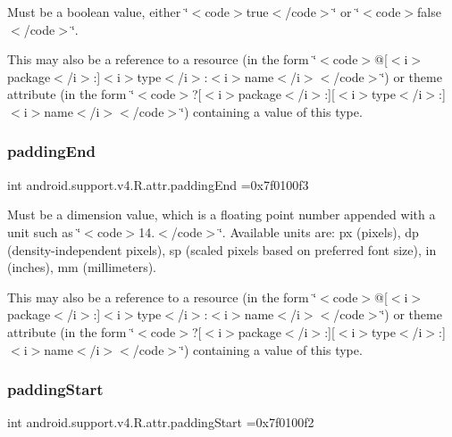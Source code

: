 Must be a boolean value, either \char`\"{}$<$code$>$true$<$/code$>$\char`\"{} or \char`\"{}$<$code$>$false$<$/code$>$\char`\"{}. 

This may also be a reference to a resource (in the form \char`\"{}$<$code$>$@\mbox{[}$<$i$>$package$<$/i$>$\+:\mbox{]}$<$i$>$type$<$/i$>$\+:$<$i$>$name$<$/i$>$$<$/code$>$\char`\"{}) or theme attribute (in the form \char`\"{}$<$code$>$?\mbox{[}$<$i$>$package$<$/i$>$\+:\mbox{]}\mbox{[}$<$i$>$type$<$/i$>$\+:\mbox{]}$<$i$>$name$<$/i$>$$<$/code$>$\char`\"{}) containing a value of this type. \mbox{\label{classandroid_1_1support_1_1v4_1_1R_1_1attr_a16d2d8f352681074b9a4bcedf9a6bb01}} 
\subsubsection{\texorpdfstring{padding\+End}{paddingEnd}}
{\footnotesize\ttfamily int android.\+support.\+v4.\+R.\+attr.\+padding\+End =0x7f0100f3\hspace{0.3cm}{\ttfamily [static]}}

Must be a dimension value, which is a floating point number appended with a unit such as \char`\"{}$<$code$>$14.\+5sp$<$/code$>$\char`\"{}. Available units are\+: px (pixels), dp (density-\/independent pixels), sp (scaled pixels based on preferred font size), in (inches), mm (millimeters). 

This may also be a reference to a resource (in the form \char`\"{}$<$code$>$@\mbox{[}$<$i$>$package$<$/i$>$\+:\mbox{]}$<$i$>$type$<$/i$>$\+:$<$i$>$name$<$/i$>$$<$/code$>$\char`\"{}) or theme attribute (in the form \char`\"{}$<$code$>$?\mbox{[}$<$i$>$package$<$/i$>$\+:\mbox{]}\mbox{[}$<$i$>$type$<$/i$>$\+:\mbox{]}$<$i$>$name$<$/i$>$$<$/code$>$\char`\"{}) containing a value of this type. \mbox{\label{classandroid_1_1support_1_1v4_1_1R_1_1attr_a43901dbed7432f76b991b19a0d9d2c3f}} 
\subsubsection{\texorpdfstring{padding\+Start}{paddingStart}}
{\footnotesize\ttfamily int android.\+support.\+v4.\+R.\+attr.\+padding\+Start =0x7f0100f2\hspace{0.3cm}{\ttfamily [static]}}

